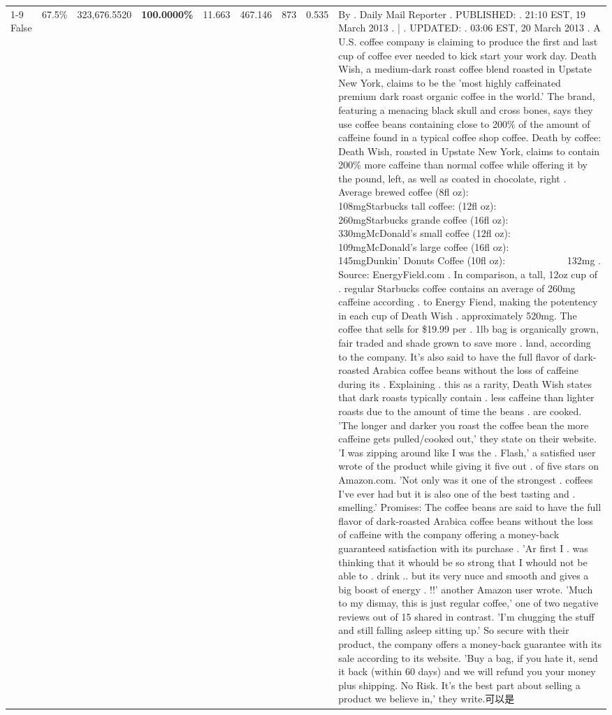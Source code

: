 \begin{table}[H]
{\begin{tabular}{lllrlllll}
\cline{1-9}
False & 67.5\% & 323,676.5520 & \bfseries \color{red} 100.0000\% & 11.663 & 467.146 & 873 & 0.535 & By . Daily Mail Reporter . PUBLISHED: . 21:10 EST, 19 March 2013 . | . UPDATED: . 03:06 EST, 20 March 2013 . A U.S. coffee company is claiming to produce the first and last cup of coffee ever needed to kick start your work day. Death Wish, a medium-dark roast coffee blend roasted in Upstate New York, claims to be the 'most highly caffeinated premium dark roast organic coffee in the world.' The brand, featuring a menacing black skull and cross bones, says they use coffee beans containing close to 200\% of the amount of caffeine found in a typical coffee shop coffee. Death by coffee: Death Wish, roasted in Upstate New York, claims to contain 200\% more caffeine than normal coffee while offering it by the pound, left, as well as coated in chocolate, right . Average brewed coffee (8fl oz):              108mgStarbucks tall coffee: (12fl oz):                260mgStarbucks grande coffee (16fl oz):         330mgMcDonald's small coffee (12fl oz):           109mgMcDonald's large coffee (16fl oz):           145mgDunkin' Donuts Coffee (10fl oz):             132mg . Source: EnergyField.com . In comparison, a tall, 12oz cup of . regular Starbucks coffee contains an average of 260mg caffeine according . to Energy Fiend, making the potentency in each cup of Death Wish . approximately 520mg. The coffee that sells for \$19.99 per . 1lb bag is organically grown, fair traded and shade grown to save more . land, according to the company. It's also said to have the full flavor of dark-roasted Arabica coffee beans without the loss of caffeine during its . Explaining . this as a rarity, Death Wish states that dark roasts typically contain . less caffeine than lighter roasts due to the amount of time the beans . are cooked. 'The longer and darker you roast the coffee bean the more caffeine gets pulled/cooked out,' they state on their website. 'I was zipping around like I was the . Flash,' a satisfied user wrote of the product while giving it five out . of five stars on Amazon.com. 'Not only was it one of the strongest . coffees I've ever had but it is also one of the best tasting and . smelling.’ Promises: The coffee beans are said to have the full flavor of dark-roasted Arabica coffee beans without the loss of caffeine with the company offering a money-back guaranteed satisfaction with its purchase . 'Ar first I . was thinking that it whould be so strong that I whould not be able to . drink .. but its very nuce and smooth and gives a big boost of energy . !!' another Amazon user wrote. 'Much to my dismay, this is just regular coffee,' one of two negative reviews out of 15 shared in contrast. 'I'm chugging the stuff and still falling asleep sitting up.' So secure with their product, the company offers a money-back guarantee with its sale according to its website. 'Buy a bag, if you hate it, send it back (within 60 days) and we will refund you your money plus shipping. No Risk. It’s the best part about selling a product we believe in,' they write.可以是 \\

\end{tabular}}
\end{table}
